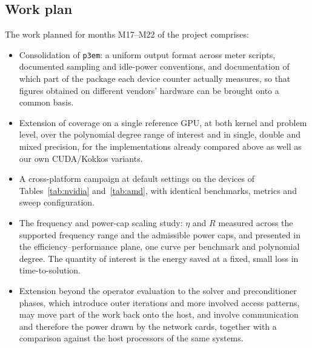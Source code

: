 \subsection{Work plan}
\label{sec:wp34plan}

The work planned for months M17--M22 of the project comprises:
%
\begin{itemize}
    \item Consolidation of \texttt{p3em}: a uniform output format across meter scripts, documented sampling and idle-power conventions, and documentation of which part of the package each device counter actually measures, so that figures obtained on different vendors' hardware can be brought onto a common basis.
    \item Extension of coverage on a single reference GPU, at both kernel and problem level, over the polynomial degree range of interest and in single, double and mixed precision, for the implementations already compared above as well as our own CUDA/Kokkos variants.
    \item A cross-platform campaign at default settings on the devices of Tables~\ref{tab:nvidia} and~\ref{tab:amd}, with identical benchmarks, metrics and sweep configuration.
    \item The frequency and power-cap scaling study: $\eta$ and $R$ measured across the supported frequency range and the admissible power caps, and presented in the efficiency--performance plane, one curve per benchmark and polynomial degree. The quantity of interest is the energy saved at a fixed, small loss in time-to-solution.
    \item Extension beyond the operator evaluation to the solver and preconditioner phases, which introduce outer iterations and more involved access patterns, may move part of the work back onto the host, and involve communication and therefore the power drawn by the network cards, together with a comparison against the host processors of the same systems.
\end{itemize}
